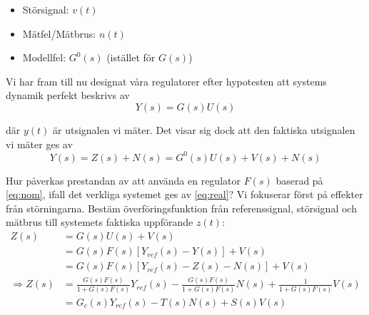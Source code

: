 \documentclass[12pt]{article}
\begin{document}
\begin{itemize}
\begin{itemize}
\item Störsignal: $v(t)$ \\
\item Mätfel/Mätbrus: $n(t)$ \\
\item Modellfel: $G^0(s)$ (istället för $G(s)$)
\end{itemize}
\end{itemize}
Vi har fram till nu designat våra regulatorer efter hypotesten att systems dynamik perfekt beskrivs av
\begin{equation}
Y(s) = G(s)U(s)\label{eq:nom}
\end{equation}

där $y(t)$ är utsignalen vi mäter. Det visar sig dock att den faktiska utsignalen vi mäter ges av
\begin{equation}
Y(s) = Z(s) + N(s) = G^0(s)U(s) + V(s) + N(s)\label{eq:real}
\end{equation}

Hur påverkas prestandan av att använda en regulator $F(s)$ baserad på \eqref{eq:nom}, ifall det verkliga systemet ges av \eqref{eq:real}? Vi fokuserar först på effekter från störningarna. Bestäm överföringsfunktion från referenssignal, störsignal och mätbrus till systemets faktiska uppförande $z(t)$:
\begin{align*}
  Z(s) &= G(s)U(s) + V(s) \\
  &= G(s)F(s)
    \left[
    Y_{ref}(s) - Y(s)
    \right] + V(s) \\
&= G(s)F(s)
    \left[
    Y_{ref}(s) - Z(s) - N(s)
    \right] + V(s) \\
\Rightarrow Z(s) &= \frac{G(s)F(s)}{1 + G(s)F(s)}Y_{ref}(s) - \frac{G(s)F(s)}{1 + G(s)F(s)}N(s) + \frac{1}{1 + G(s)F(s)}V(s) \\
&= G_c(s)Y_{ref}(s) - T(s)N(s) + S(s)V(s)
\end{align*}
\end{document}
